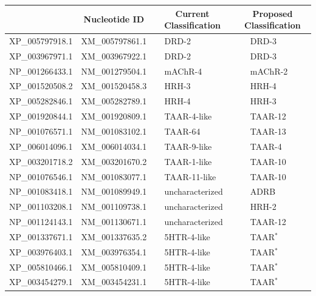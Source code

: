 \documentclass[fleqn,10pt]{wlpeerj}
\begin{document}
\newpage

\begin{table}[htbp]
	\centering
	\begin{tabular}{l l l l l l}
		\hline\noalign{\smallskip}
		\multicolumn{1}{c}{Protein ID} & \multicolumn{1}{c}{Nucleotide ID} & \multicolumn{2}{c}{Current Classification} & \multicolumn{2}{c}{Proposed Classification} \\
		\hline\noalign{\smallskip}
		XP\_005797918.1 & XM\_005797861.1 & \qquad \qquad & DRD-2 & \qquad \qquad & DRD-3 \\
		XP\_003967971.1 & XM\_003967922.1 & \qquad \qquad & DRD-2 & \qquad \qquad & DRD-3 \\
		NP\_001266433.1 & NM\_001279504.1 & \qquad \qquad & mAChR-4 & \qquad \qquad & mAChR-2 \\
		XP\_001520508.2 & XM\_001520458.3 & \qquad \qquad & HRH-3 & \qquad \qquad & HRH-4 \\
		XP\_005282846.1 & XM\_005282789.1 & \qquad \qquad & HRH-4 & \qquad \qquad & HRH-3 \\
		XP\_001920844.1 & XM\_001920809.1 & \qquad \qquad & TAAR-4-like & \qquad \qquad & TAAR-12 \\
		NP\_001076571.1 & NM\_001083102.1 & \qquad \qquad & TAAR-64 & \qquad \qquad & TAAR-13 \\
		XP\_006014096.1 & XM\_006014034.1 & \qquad \qquad & TAAR-9-like & \qquad \qquad & TAAR-4 \\
		XP\_003201718.2 & XM\_003201670.2 & \qquad \qquad & TAAR-1-like & \qquad \qquad & TAAR-10 \\
		NP\_001076546.1 & NM\_001083077.1 & \qquad \qquad & TAAR-11-like & \qquad \qquad & TAAR-10 \\
		NP\_001083418.1 & NM\_001089949.1 & \qquad \qquad & uncharacterized & \qquad \qquad & ADRB \\
		NP\_001103208.1 & NM\_001109738.1 & \qquad \qquad & uncharacterized & \qquad \qquad & HRH-2 \\
		NP\_001124143.1 & NM\_001130671.1 & \qquad \qquad & uncharacterized & \qquad \qquad & TAAR-12 \\
		XP\_001337671.1 & XM\_001337635.2 & \qquad \qquad & 5HTR-4-like & \qquad \qquad & TAAR$^\ast$ \\
		XP\_003976403.1 & XM\_003976354.1 & \qquad \qquad & 5HTR-4-like & \qquad \qquad & TAAR$^\ast$ \\
		XP\_005810466.1 & XM\_005810409.1 & \qquad \qquad & 5HTR-4-like & \qquad \qquad & TAAR$^\ast$ \\
		XP\_003454279.1 & XM\_003454231.1 & \qquad \qquad & 5HTR-4-like & \qquad \qquad & TAAR$^\ast$ \\

\end{tabular}
\end{table}
\end{document}
